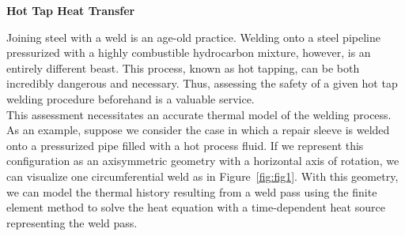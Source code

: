 %
\bigskip
{\Large {\bf Hot Tap Heat Transfer}}
\bigskip

\begin{quotationb}Joining steel with a weld is an age-old practice. Welding onto a steel pipeline pressurized with a highly combustible hydrocarbon mixture, however, is an entirely different beast. This process, known as hot tapping, can be both incredibly dangerous and necessary. Thus, assessing the safety of a given hot tap welding procedure beforehand is a valuable service.  \\

\noindent This assessment necessitates an accurate thermal model of the welding process. As an example, suppose we consider the case in which a repair sleeve is welded onto a pressurized pipe filled with a hot process fluid. If we represent this configuration as an axisymmetric geometry with a horizontal axis of rotation, we can visualize one circumferential weld as in Figure~\ref{fig:fig1}. With this geometry, we can model the thermal history resulting from a weld pass using the finite element method to solve the heat equation with a time-dependent heat source representing the weld pass. \\


\end{quotationb}
